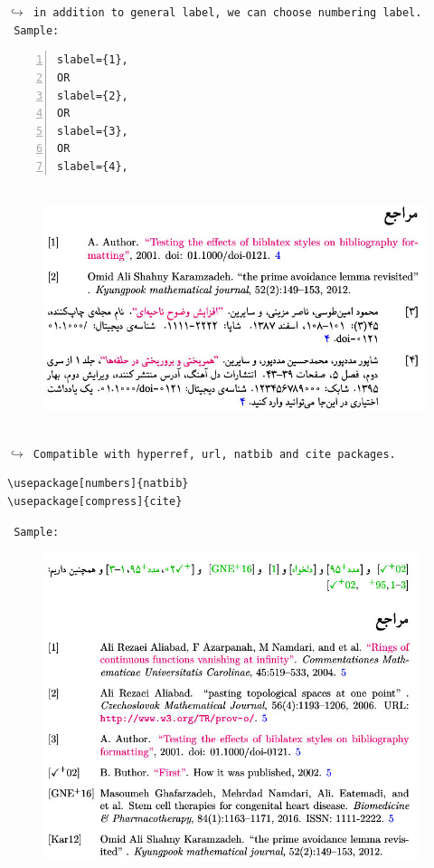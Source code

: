 \documentclass{article}
\begin{document}
\begin{latin}
{\tt{\color{red}$\hookrightarrow$  in addition to general label, we can choose numbering label.}}\\
{\tt\color{blue} Sample:}
\begin{Verbatim}[numbers=left,fontsize=\bf,commandchars=\&\#\*,baselinestretch=1,firstnumber=1,formatcom=\color{green!50!black}]
slabel={1},
OR
slabel={2},
OR
slabel={3},
OR
slabel={4},
\end{Verbatim}
\end{latin}
\begin{figure}[H]
\centering
\includegraphics[width=\textwidth,height=7cm]{image/sh8}
\end{figure}
\begin{latin}
{\tt {\color{red}$\hookrightarrow$ Compatible with  hyperref, url, natbib and cite packages.}}
\end{latin}
\begin{latin}
\begin{verbatim}
\usepackage[numbers]{natbib}
\usepackage[compress]{cite} 
\end{verbatim}
{\tt\color{blue} Sample:}
\end{latin}
\begin{figure}[H]
\centering
\includegraphics[width=\textwidth,height=9cm]{image/sh9}
\end{figure}
\end{document}

